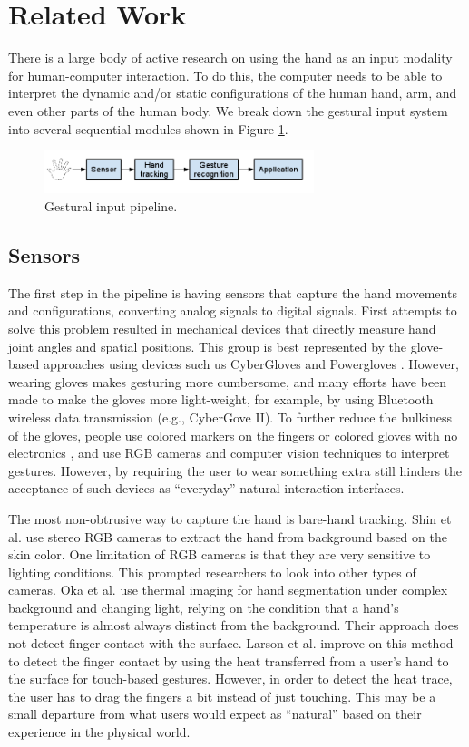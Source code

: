 \section{Related Work}
There is a large body of active research on using the hand as an input modality
for human-computer interaction. To do this, the computer needs to be able to
interpret the dynamic and/or static configurations of the human hand, arm, and
even other parts of the human body. We break down the gestural input
system into several sequential modules shown in Figure \ref{fig:pipeline}.

\begin{figure}[h]
  \centering
  \includegraphics[width=0.7\textwidth]{figures/pipeline.png} 
  \caption{Gestural input pipeline.}
  \label{fig:pipeline}
\end{figure}

\subsection{Sensors}
The first step in the pipeline is having sensors that capture the hand movements
and configurations, converting analog signals to digital signals. First attempts
to solve this problem resulted in mechanical devices that directly measure hand
joint angles and spatial positions. This group is best represented by the
glove-based approaches using devices such us CyberGloves \cite{fels09} and
Powergloves \cite{kadous02}. However, wearing gloves makes gesturing more
cumbersome, and many efforts have been made to make the gloves more
light-weight, for example, by using Bluetooth wireless data transmission (e.g.,
CyberGove II). To further reduce the bulkiness of the gloves, people use colored
markers on the fingers \cite{mistry09} or colored gloves with no electronics \cite{Wang09}, and use RGB
cameras and computer vision techniques to interpret gestures. However, by
requiring the user to wear something extra still hinders the acceptance of
such devices as ``everyday'' natural interaction interfaces. 

The most non-obtrusive way to capture the hand is bare-hand tracking. Shin et
al. \cite{Shin04} use stereo RGB cameras to extract the hand from background based on the skin color. One
limitation of RGB cameras is that they are very sensitive to lighting
conditions. This prompted researchers to look into other types of cameras. Oka et al. 
\cite{Oka02} use thermal imaging for hand segmentation under complex
background and changing light, relying on the condition that a hand's
temperature is almost always distinct from the background. Their approach does
not detect finger contact with the surface. Larson et al. \cite{larson11}
improve on this method to detect the finger contact by using
the heat transferred from a user's hand to the surface for touch-based gestures.
However, in order to detect the heat trace, the user has to drag the fingers a
bit instead of just touching. This may be a small departure from what users
would expect as ``natural'' based on their experience in the physical world.

